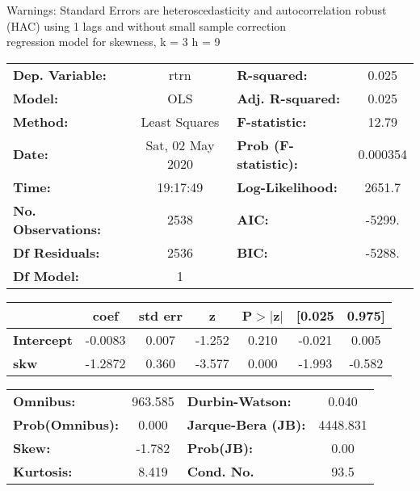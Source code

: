 Warnings: \newline
 [1] Standard Errors are heteroscedasticity and autocorrelation robust (HAC) using 1 lags and without small sample correction\\ 

regression model for skewness, k = 3 h = 9\begin{center}
\begin{tabular}{lclc}
\toprule
\textbf{Dep. Variable:}    &       rtrn       & \textbf{  R-squared:         } &     0.025   \\
\textbf{Model:}            &       OLS        & \textbf{  Adj. R-squared:    } &     0.025   \\
\textbf{Method:}           &  Least Squares   & \textbf{  F-statistic:       } &     12.79   \\
\textbf{Date:}             & Sat, 02 May 2020 & \textbf{  Prob (F-statistic):} &  0.000354   \\
\textbf{Time:}             &     19:17:49     & \textbf{  Log-Likelihood:    } &    2651.7   \\
\textbf{No. Observations:} &        2538      & \textbf{  AIC:               } &    -5299.   \\
\textbf{Df Residuals:}     &        2536      & \textbf{  BIC:               } &    -5288.   \\
\textbf{Df Model:}         &           1      & \textbf{                     } &             \\
\bottomrule
\end{tabular}
\begin{tabular}{lcccccc}
                   & \textbf{coef} & \textbf{std err} & \textbf{z} & \textbf{P$> |$z$|$} & \textbf{[0.025} & \textbf{0.975]}  \\
\midrule
\textbf{Intercept} &      -0.0083  &        0.007     &    -1.252  &         0.210        &       -0.021    &        0.005     \\
\textbf{skw}       &      -1.2872  &        0.360     &    -3.577  &         0.000        &       -1.993    &       -0.582     \\
\bottomrule
\end{tabular}
\begin{tabular}{lclc}
\textbf{Omnibus:}       & 963.585 & \textbf{  Durbin-Watson:     } &    0.040  \\
\textbf{Prob(Omnibus):} &   0.000 & \textbf{  Jarque-Bera (JB):  } & 4448.831  \\
\textbf{Skew:}          &  -1.782 & \textbf{  Prob(JB):          } &     0.00  \\
\textbf{Kurtosis:}      &   8.419 & \textbf{  Cond. No.          } &     93.5  \\
\bottomrule
\end{tabular}
\end{center}

